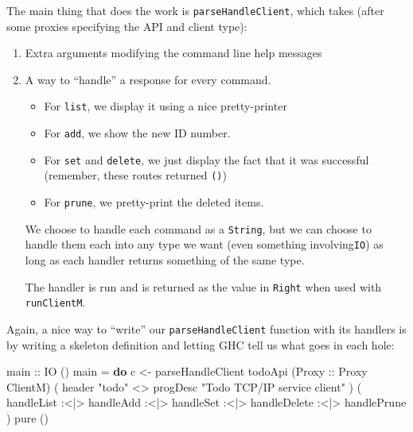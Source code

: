 \documentclass[]{article}
\newenvironment{Shaded}{}{}
\newcommand{\DataTypeTok}[1]{\textcolor[rgb]{0.56,0.13,0.00}{#1}}
\newcommand{\FunctionTok}[1]{\textcolor[rgb]{0.02,0.16,0.49}{#1}}
\newcommand{\KeywordTok}[1]{\textcolor[rgb]{0.00,0.44,0.13}{\textbf{#1}}}
\newcommand{\NormalTok}[1]{#1}
\newcommand{\OperatorTok}[1]{\textcolor[rgb]{0.40,0.40,0.40}{#1}}
\newcommand{\OtherTok}[1]{\textcolor[rgb]{0.00,0.44,0.13}{#1}}
\newcommand{\StringTok}[1]{\textcolor[rgb]{0.25,0.44,0.63}{#1}}
\begin{document}
The main thing that does the work is \texttt{parseHandleClient}, which takes
(after some proxies specifying the API and client type):

\begin{enumerate}
\def\labelenumi{\arabic{enumi}.}
\item
  Extra arguments modifying the command line help messages
\item
  A way to ``handle'' a response for every command.

  \begin{itemize}
  \tightlist
  \item
    For \texttt{list}, we display it using a nice pretty-printer
  \item
    For \texttt{add}, we show the new ID number.
  \item
    For \texttt{set} and \texttt{delete}, we just display the fact that it was
    successful (remember, these routes returned \texttt{()})
  \item
    For \texttt{prune}, we pretty-print the deleted items.
  \end{itemize}

  We choose to handle each command as a \texttt{String}, but we can choose to
  handle them each into any type we want (even something involving\texttt{IO})
  as long as each handler returns something of the same type.

  The handler is run and is returned as the value in \texttt{Right} when used
  with \texttt{runClientM}.
\end{enumerate}

Again, a nice way to ``write'' our \texttt{parseHandleClient} function with its
handlers is by writing a skeleton definition and letting GHC tell us what goes
in each hole:

\begin{Shaded}
\begin{Highlighting}[]
\OtherTok{main ::} \DataTypeTok{IO}\NormalTok{ ()}
\NormalTok{main }\OtherTok{=} \KeywordTok{do}
\NormalTok{    c }\OtherTok{<{-}}\NormalTok{ parseHandleClient todoApi (}\DataTypeTok{Proxy}\OtherTok{ ::} \DataTypeTok{Proxy} \DataTypeTok{ClientM}\NormalTok{)}
\NormalTok{        ( header }\StringTok{"todo"} \OperatorTok{<>}\NormalTok{ progDesc }\StringTok{"Todo TCP/IP service client"}\NormalTok{ )}
\NormalTok{        ( handleList}
     \OperatorTok{:<|>}\NormalTok{ handleAdd}
     \OperatorTok{:<|>}\NormalTok{ handleSet}
     \OperatorTok{:<|>}\NormalTok{ handleDelete}
     \OperatorTok{:<|>}\NormalTok{ handlePrune}
\NormalTok{        )}
    \FunctionTok{pure}\NormalTok{ ()}
\end{Highlighting}
\end{Shaded}
\end{document}
